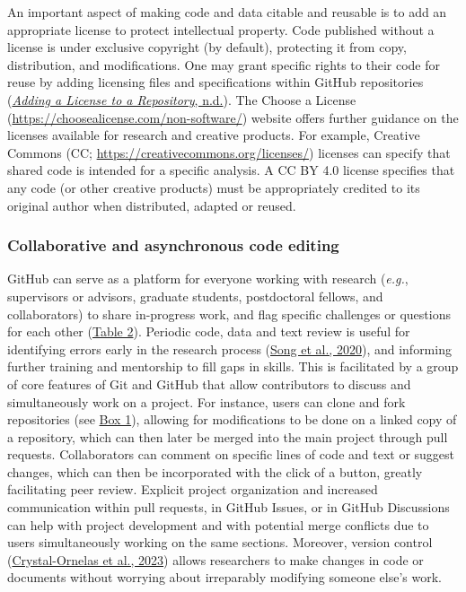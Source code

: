 An important aspect of making code and data citable and reusable is to add an appropriate license to protect intellectual property.
Code published without a license is under exclusive copyright (by default), protecting it from copy, distribution, and modifications.
One may grant specific rights to their code for reuse by adding licensing files and specifications within GitHub repositories (\protect\hyperlink{ref-TOsASkn5}{\emph{Adding a License to a Repository}, n.d.}).
The Choose a License (\url{https://choosealicense.com/non-software/}) website offers further guidance on the licenses available for research and creative products.
For example, Creative Commons (CC; \url{https://creativecommons.org/licenses/}) licenses can specify that shared code is intended for a specific analysis.
A CC BY 4.0 license specifies that any code (or other creative products) must be appropriately credited to its original author when distributed, adapted or reused.

\hypertarget{code-editing}{%
\subsubsection{Collaborative and asynchronous code editing}\label{code-editing}}

GitHub can serve as a platform for everyone working with research (\emph{e.g.}, supervisors or advisors, graduate students, postdoctoral fellows, and collaborators) to share in-progress work, and flag specific challenges or questions for each other (\protect\hyperlink{tbl:roles}{Table 2}).
Periodic code, data and text review is useful for identifying errors early in the research process (\protect\hyperlink{ref-hm9PaCLD}{Song et al., 2020}), and informing further training and mentorship to fill gaps in skills.
This is facilitated by a group of core features of Git and GitHub that allow contributors to discuss and simultaneously work on a project.
For instance, users can clone and fork repositories (see \protect\hyperlink{definitions}{Box 1}), allowing for modifications to be done on a linked copy of a repository, which can then later be merged into the main project through pull requests.
Collaborators can comment on specific lines of code and text or suggest changes, which can then be incorporated with the click of a button, greatly facilitating peer review.
Explicit project organization and increased communication within pull requests, in GitHub Issues, or in GitHub Discussions can help with project development and with potential merge conflicts due to users simultaneously working on the same sections.
Moreover, version control (\protect\hyperlink{ref-K7nbP1Ty}{Crystal-Ornelas et al., 2023}) allows researchers to make changes in code or documents without worrying about irreparably modifying someone else's work.

